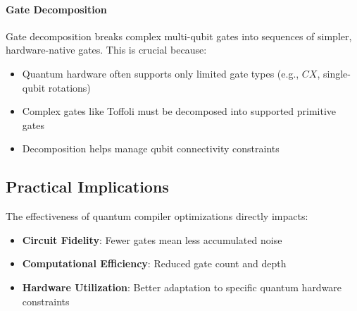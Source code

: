 

\paragraph{Gate Decomposition}
Gate decomposition breaks complex multi-qubit gates into sequences of
simpler, hardware-native gates. This is crucial because:

\begin{itemize}
  \item Quantum hardware often supports only limited gate types (e.g., $CX$,
    single-qubit rotations)

  \item Complex gates like Toffoli must be decomposed into supported
    primitive gates

  \item Decomposition helps manage qubit connectivity constraints
\end{itemize}


\subsection*{Practical Implications}

The effectiveness of quantum compiler optimizations directly impacts:

\begin{itemize}
  \item \textbf{Circuit Fidelity}: Fewer gates mean less accumulated noise

  \item \textbf{Computational Efficiency}: Reduced gate count and depth

  \item \textbf{Hardware Utilization}: Better adaptation to specific quantum
    hardware constraints
\end{itemize}



